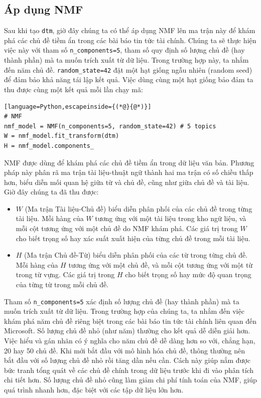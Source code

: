 \subsection{Áp dụng NMF}

Sau khi tạo \texttt{dtm}, giờ đây chúng ta có thể áp dụng NMF lên ma trận này để khám phá các chủ đề tiềm ẩn trong các bài báo tin tức tài chính. Chúng ta sẽ thực hiện việc này với tham số \texttt{n\_components=5}, tham số quy định số lượng chủ đề (hay thành phần) mà ta muốn trích xuất từ dữ liệu. Trong trường hợp này, ta nhắm đến năm chủ đề. \texttt{random\_state=42} đặt một hạt giống ngẫu nhiên (random seed) để đảm bảo khả năng tái lập kết quả. Việc dùng cùng một hạt giống bảo đảm ta thu được cùng một kết quả mỗi lần chạy mã:

\begin{lstlisting}[language=Python,escapeinside={(*@}{@*)}]
# NMF
nmf_model = NMF(n_components=5, random_state=42) # 5 topics
W = nmf_model.fit_transform(dtm)
H = nmf_model.components_
\end{lstlisting}

NMF được dùng để khám phá các chủ đề tiềm ẩn trong dữ liệu văn bản. Phương pháp này phân rã ma trận tài liệu-thuật ngữ thành hai ma trận có số chiều thấp hơn, biểu diễn mối quan hệ giữa từ và chủ đề, cũng như giữa chủ đề và tài liệu. Giờ đây chúng ta đã thu được:

\begin{itemize}
\item
  \(W\) (Ma trận Tài liệu-Chủ đề) biểu diễn phân phối của các chủ đề trong từng tài liệu. Mỗi hàng của \(W\) tương ứng với một tài liệu trong kho ngữ liệu, và mỗi cột tương ứng với một chủ đề do NMF khám phá. Các giá trị trong \(W\) cho biết trọng số hay xác suất xuất hiện của từng chủ đề trong mỗi tài liệu.
\item
  \(H\) (Ma trận Chủ đề-Từ) biểu diễn phân phối của các từ trong từng chủ đề. Mỗi hàng của \(H\) tương ứng với một chủ đề, và mỗi cột tương ứng với một từ trong từ vựng. Các giá trị trong \(H\) cho biết trọng số hay mức độ quan trọng của từng từ trong mỗi chủ đề.
\end{itemize}

Tham số \texttt{n\_components=5} xác định số lượng chủ đề (hay thành phần) mà ta muốn trích xuất từ dữ liệu. Trong trường hợp của chúng ta, ta nhắm đến việc khám phá năm chủ đề riêng biệt trong các bài báo tin tức tài chính liên quan đến Microsoft. Số lượng chủ đề nhỏ (như năm) thường cho kết quả dễ diễn giải hơn. Việc hiểu và gán nhãn có ý nghĩa cho năm chủ đề dễ dàng hơn so với, chẳng hạn, 20 hay 50 chủ đề. Khi mới bắt đầu với mô hình hóa chủ đề, thông thường nên bắt đầu với số lượng chủ đề nhỏ rồi tăng dần nếu cần. Cách này giúp nắm được bức tranh tổng quát về các chủ đề chính trong dữ liệu trước khi đi vào phân tích chi tiết hơn. Số lượng chủ đề nhỏ cũng làm giảm chi phí tính toán của NMF, giúp quá trình nhanh hơn, đặc biệt với các tập dữ liệu lớn hơn.

